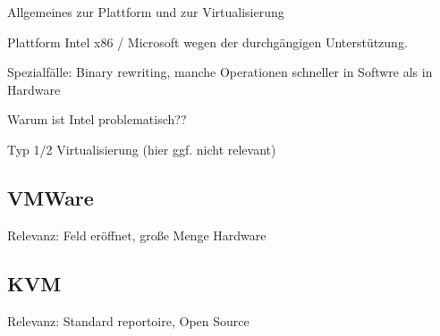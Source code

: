 		Allgemeines zur Plattform und zur Virtualisierung

		Plattform Intel x86 / Microsoft wegen der durchgängigen Unterstützung. \cite{PopekGoldberg}

		Spezialfälle: Binary rewriting, manche Operationen schneller in Softwre als in Hardware

		Warum ist Intel problematisch??

		Typ 1/2 Virtualisierung (hier ggf. nicht relevant)


		\subsection{VMWare}

		Relevanz: Feld eröffnet, große Menge Hardware

		\subsection{KVM}

		Relevanz: Standard reportoire, Open Source

		